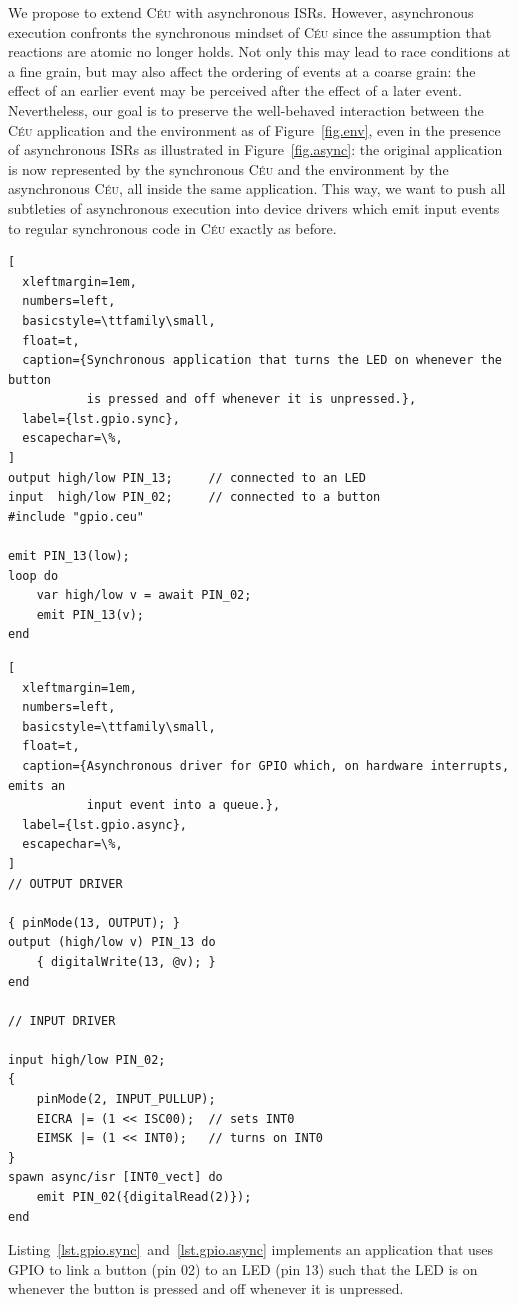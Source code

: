\documentclass[sigplan,10pt,review,anonymous]{acmart}\settopmatter{printfolios=true,printccs=false,printacmref=false}
\newcommand{\CEU}{\textsc{C\'{e}u}\xspace}
\begin{document}
We propose to extend \CEU with asynchronous ISRs.
However, asynchronous execution confronts the synchronous mindset of \CEU since
the assumption that reactions are atomic no longer holds.
Not only this may lead to race conditions at a fine grain, but may also affect
the ordering of events at a coarse grain: the effect of an earlier event may be
perceived after the effect of a later event.
%
Nevertheless, our goal is to preserve the well-behaved interaction between the
\CEU application and the environment as of Figure~\ref{fig.env}, even in the
presence of asynchronous ISRs as illustrated in Figure~\ref{fig.async}:
%
the original application is now represented by the synchronous \CEU and the
environment by the asynchronous \CEU, all inside the same application.
%
This way, we want to push all subtleties of asynchronous execution into device
drivers which emit input events to regular synchronous code in \CEU exactly
as before.

\begin{lstlisting}[
  xleftmargin=1em,
  numbers=left,
  basicstyle=\ttfamily\small,
  float=t,
  caption={Synchronous application that turns the LED on whenever the button
           is pressed and off whenever it is unpressed.},
  label={lst.gpio.sync},
  escapechar=\%,
]
output high/low PIN_13;     // connected to an LED
input  high/low PIN_02;     // connected to a button
#include "gpio.ceu"

emit PIN_13(low);
loop do
    var high/low v = await PIN_02;
    emit PIN_13(v);
end
\end{lstlisting}

\begin{lstlisting}[
  xleftmargin=1em,
  numbers=left,
  basicstyle=\ttfamily\small,
  float=t,
  caption={Asynchronous driver for GPIO which, on hardware interrupts, emits an
           input event into a queue.},
  label={lst.gpio.async},
  escapechar=\%,
]
// OUTPUT DRIVER

{ pinMode(13, OUTPUT); }
output (high/low v) PIN_13 do
    { digitalWrite(13, @v); }
end

// INPUT DRIVER

input high/low PIN_02;
{
    pinMode(2, INPUT_PULLUP);
    EICRA |= (1 << ISC00);  // sets INT0
    EIMSK |= (1 << INT0);   // turns on INT0
}
spawn async/isr [INT0_vect] do
    emit PIN_02({digitalRead(2)});
end
\end{lstlisting}

Listing~\ref{lst.gpio.sync}~and~\ref{lst.gpio.async} implements an application
that uses GPIO to link a button (pin 02) to an LED (pin 13) such that the LED
is on whenever the button is pressed and off whenever it is unpressed.
\end{document}
